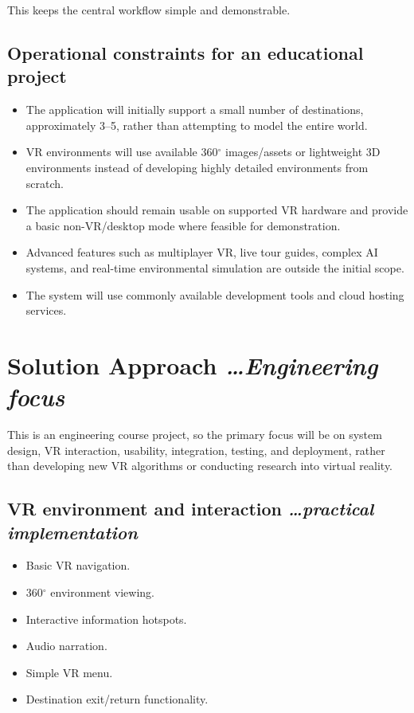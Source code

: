 \documentclass[11pt,a4paper]{article}
\newcommand{\BvrHint}[1]{%
  {\normalfont\normalsize\itshape\hfill #1}}
\begin{document}
This keeps the central workflow simple and demonstrable.

\subsection{Operational constraints for an educational project}

\begin{itemize}[leftmargin=0.7cm]
    \item The application will initially support a small number of destinations, approximately 3--5, rather than attempting to model the entire world.
    \item VR environments will use available 360$^\circ$ images/assets or lightweight 3D environments instead of developing highly detailed environments from scratch.
    \item The application should remain usable on supported VR hardware and provide a basic non-VR/desktop mode where feasible for demonstration.
    \item Advanced features such as multiplayer VR, live tour guides, complex AI systems, and real-time environmental simulation are outside the initial scope.
    \item The system will use commonly available development tools and cloud hosting services.
\end{itemize}

\section{Solution Approach%
  \BvrHint{\ldots Engineering focus}}

This is an engineering course project, so the primary focus will be on system design, VR interaction,
usability, integration, testing, and deployment, rather than developing new VR algorithms or
conducting research into virtual reality.

\subsection{VR environment and interaction%
  \BvrHint{\ldots practical implementation}}

\begin{itemize}[leftmargin=0.7cm]
    \item Basic VR navigation.
    \item 360$^\circ$ environment viewing.
    \item Interactive information hotspots.
    \item Audio narration.
    \item Simple VR menu.
    \item Destination exit/return functionality.
\end{itemize}
\end{document}
